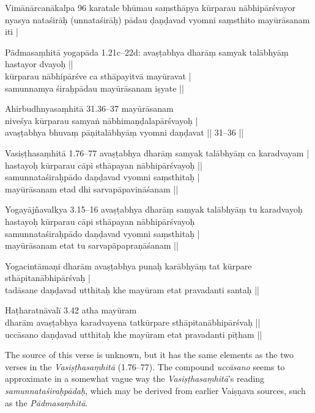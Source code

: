 \begin{ekdosis}
\begin{sources}[hp01_030]
Vimānārcanākalpa 96
\startverse
karatale bhūmau saṃsthāpya kūrparau nābhipārśvayor nyasya nataśirāḥ (unnataśirāḥ) pādau ḍaṇḍavad vyomni saṃsthito mayūrāsanam iti |
\endverse

Pādmasaṃhitā yogapāda 1.21c–22d:
\startverse
avaṣṭabhya dharāṃ samyak talābhyāṃ hastayor dvayoḥ ||\\
kūrparau nābhipārśve ca sthāpayitvā mayūravat |\\
samunnamya śiraḥpādau mayūrāsanam iṣyate ||
\endverse

Ahirbudhnyasaṃhitā 31.36–37
\startverse
mayūrāsanam\\
niveśya kūrparau samyaṅ nābhimaṇḍalapārśvayoḥ |\\
avaṣṭabhya bhuvaṃ pāṇitalābhyāṃ vyomni daṇḍavat || 31--36 ||
\endverse

Vasiṣṭhasaṃhitā 1.76–77
\startverse
avaṣṭabhya dharāṃ samyak talābhyāṃ ca karadvayam |\\
hastayoḥ kūrparau cāpi sthāpayan nābhipārśvayoḥ ||\\
samunnataśiraḥpādo daṇḍavad vyomni saṃsthitaḥ |\\
mayūrāsanam etad dhi sarvapāpavināśanam ||
\endverse

Yogayājñavalkya 3.15–16
\startverse
avaṣṭabhya dharāṃ samyak talābhyāṃ tu karadvayoḥ\\
hastayoḥ kūrparau cāpi sthāpayan nābhipārśvayoḥ\\
samunnataśiraḥpādo daṇḍavad vyomni saṃsthitaḥ |\\
mayūrāsanam etat tu sarvapāpapraṇāśanam ||
\endverse
\end{sources}

\begin{testimonia}[hp01_030]
Yogacintāmaṇi
\startverse
dharām avaṣṭabhya punaḥ karābhyāṃ
tat kūrpare sthāpitanābhipārśvaḥ | \\
tadāsane daṇḍavad utthitaḥ khe
mayūram etat pravadanti santaḥ ||
\endverse

Haṭharatnāvalī 3.42
\startverse
atha mayūram\\
dharām avaṣṭabhya karadvayena tatkūrpare sthāpitanābhipārśvaḥ ||\\
uccāsano daṇḍavad utthitaḥ khe mayūram etat pravadanti pīṭham ||
\endverse
\end{testimonia}

\begin{philcomm}[hp01_030]
The source of this verse is unknown, but it has the same elements as the two verses in the \emph{Vasiṣṭhasaṃhitā} (1.76–77). The compound \emph{uccāsano} seems to approximate in a somewhat vague way the \emph{Vasiṣṭhasaṃhitā}’s reading \emph{samunnataśiraḥpādaḥ}, which may be derived from earlier Vaiṣṇava sources, such as the \textit{Pādmasaṃhitā}. 
 


\end{philcomm}
\end{ekdosis}

